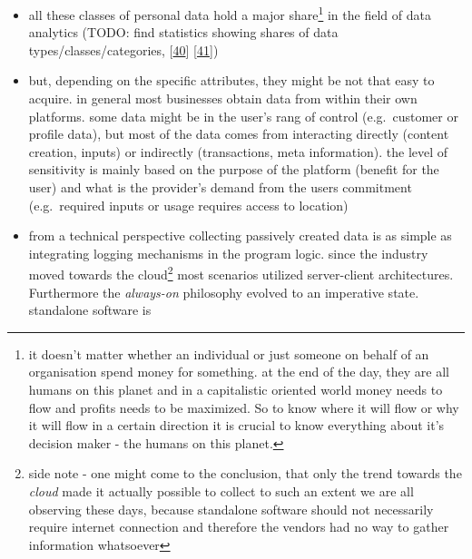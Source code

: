 \documentclass[12pt,english,a4paper,titlepage,cleardoublepage=empty,dottedtoc]{report}
\begin{document}
\begin{itemize}
  changes, or web search history and goes all the way up to health data
  and self-created content like \emph{Tweets}\footnote{public massages
    published by an account on \url{twitter.com}, which will be
    displayed in the timeline of all her subscribers and also might
    contain additional types of content like images, links or video} or
  videos.
\item
  all these classes of personal data hold a major share\footnote{it
    doesn't matter whether an individual or just someone on behalf of an
    organisation spend money for something. at the end of the day, they
    are all humans on this planet and in a capitalistic oriented world
    money needs to flow and profits needs to be maximized. So to know
    where it will flow or why it will flow in a certain direction it is
    crucial to know everything about it's decision maker - the humans on
    this planet.} in the field of data analytics (TODO: find statistics
  showing shares of data types/classes/categories,
  {[}\protect\hyperlink{ref-book-chapter_1999_Principles-of-knowledge-discovery-in-databases_introduction-to-data-mining}{40}{]}
  {[}\protect\hyperlink{ref-web_2013_big-data-collection-collides-with-privacy-concerns}{41}{]})
\item
  but, depending on the specific attributes, they might be not that easy
  to acquire. in general most businesses obtain data from within their
  own platforms. some data might be in the user's rang of control
  (e.g.~customer or profile data), but most of the data comes from
  interacting directly (content creation, inputs) or indirectly
  (transactions, meta information). the level of sensitivity is mainly
  based on the purpose of the platform (benefit for the user) and what
  is the provider's demand from the users commitment (e.g.~required
  inputs or usage requires access to location)
\item
  from a technical perspective collecting passively created data is as
  simple as integrating logging mechanisms in the program logic. since
  the industry moved towards the cloud\footnote{side note - one might
    come to the conclusion, that only the trend towards the \emph{cloud}
    made it actually possible to collect to such an extent we are all
    observing these days, because standalone software should not
    necessarily require internet connection and therefore the vendors
    had no way to gather information whatsoever} most scenarios utilized
  server-client architectures. Furthermore the \emph{always-on}
  philosophy evolved to an imperative state. standalone software is

\end{itemize}
\end{document}

